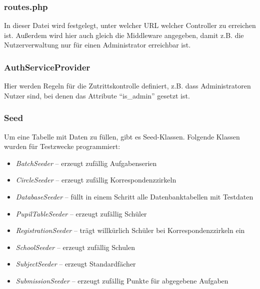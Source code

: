 \subsubsection{routes.php}

In dieser Datei wird festgelegt, unter welcher URL welcher Controller zu erreichen ist. Außerdem wird hier auch gleich die Middleware angegeben, damit z.B. die Nutzerverwaltung nur für einen Administrator erreichbar ist.

\subsubsection{AuthServiceProvider}

Hier werden Regeln für die Zutrittskontrolle definiert, z.B. dass Administratoren Nutzer sind, bei denen das Attribute "`is\_admin"' gesetzt ist.

\subsubsection{Seed}

Um eine Tabelle mit Daten zu füllen, gibt es Seed-Klassen. Folgende Klassen wurden für Testzwecke programmiert:

\begin{itemize}
	\item \textit{BatchSeeder} -- erzeugt zufällig Aufgabenserien
	\item \textit{CircleSeeder} -- erzeugt zufällig Korrespondenzzirkeln
	\item \textit{DatabaseSeeder} -- füllt in einem Schritt alle Datenbanktabellen mit Testdaten
	\item \textit{PupilTableSeeder} -- erzeugt zufällig Schüler
	\item \textit{RegistrationSeeder} -- trägt willkürlich Schüler bei Korrespondenzzirkeln ein
	\item \textit{SchoolSeeder} -- erzeugt zufällig Schulen
	\item \textit{SubjectSeeder} -- erzeugt Standardfächer
	\item \textit{SubmissionSeeder} -- erzeugt zufällig Punkte für abgegebene Aufgaben
\end{itemize}
